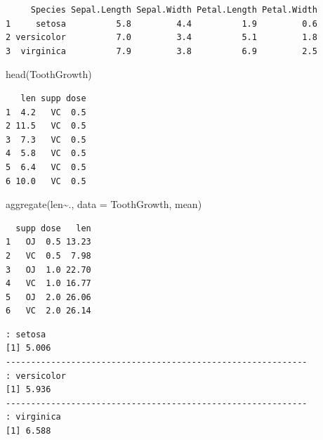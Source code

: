 \documentclass[
  letterpaper,
  DIV=11,
  numbers=noendperiod]{scrreprt}
\newenvironment{Shaded}{\begin{snugshade}}{\end{snugshade}}
\newcommand{\AttributeTok}[1]{\textcolor[rgb]{0.40,0.45,0.13}{#1}}
\newcommand{\CommentTok}[1]{\textcolor[rgb]{0.37,0.37,0.37}{#1}}
\newcommand{\DecValTok}[1]{\textcolor[rgb]{0.68,0.00,0.00}{#1}}
\newcommand{\FunctionTok}[1]{\textcolor[rgb]{0.28,0.35,0.67}{#1}}
\newcommand{\NormalTok}[1]{\textcolor[rgb]{0.00,0.23,0.31}{#1}}
\newcommand{\SpecialCharTok}[1]{\textcolor[rgb]{0.37,0.37,0.37}{#1}}
\begin{document}
\begin{verbatim}
     Species Sepal.Length Sepal.Width Petal.Length Petal.Width
1     setosa          5.8         4.4          1.9         0.6
2 versicolor          7.0         3.4          5.1         1.8
3  virginica          7.9         3.8          6.9         2.5
\end{verbatim}

\begin{Shaded}
\begin{Highlighting}[]
\FunctionTok{head}\NormalTok{(ToothGrowth)}
\end{Highlighting}
\end{Shaded}

\begin{verbatim}
   len supp dose
1  4.2   VC  0.5
2 11.5   VC  0.5
3  7.3   VC  0.5
4  5.8   VC  0.5
5  6.4   VC  0.5
6 10.0   VC  0.5
\end{verbatim}

\begin{Shaded}
\begin{Highlighting}[]
\FunctionTok{aggregate}\NormalTok{(len}\SpecialCharTok{\textasciitilde{}}\NormalTok{., }\AttributeTok{data =}\NormalTok{ ToothGrowth, mean)}
\end{Highlighting}
\end{Shaded}

\begin{verbatim}
  supp dose   len
1   OJ  0.5 13.23
2   VC  0.5  7.98
3   OJ  1.0 22.70
4   VC  1.0 16.77
5   OJ  2.0 26.06
6   VC  2.0 26.14
\end{verbatim}

\begin{Shaded}
\end{Shaded}

\begin{verbatim}
: setosa
[1] 5.006
------------------------------------------------------------ 
: versicolor
[1] 5.936
------------------------------------------------------------ 
: virginica
[1] 6.588
\end{verbatim}

\begin{Shaded}
\end{Shaded}
\end{document}
